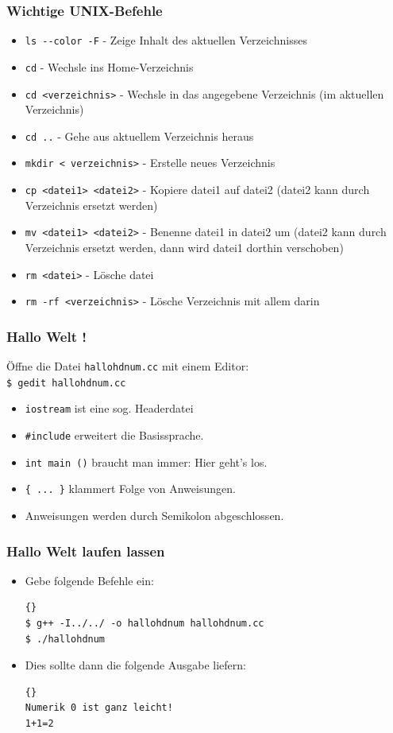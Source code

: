 \documentclass[ignorenonframetext,12pt]{beamer}
\theoremstyle{definition}
\theoremstyle{definition}
\begin{document}
\begin{frame}
\frametitle{Wichtige UNIX-Befehle}
\begin{itemize}
\item \lstinline{ls --color -F} - Zeige Inhalt des aktuellen Verzeichnisses
\item \lstinline{cd} - Wechsle ins Home-Verzeichnis
\item \lstinline{cd <verzeichnis>} - Wechsle in das angegebene
  Verzeichnis (im aktuellen Verzeichnis)
\item \lstinline{cd ..} - Gehe aus aktuellem Verzeichnis heraus
\item \lstinline{mkdir < verzeichnis>} - Erstelle neues Verzeichnis
\item \lstinline{cp <datei1> <datei2>} - Kopiere datei1 auf datei2
  (datei2 kann durch Verzeichnis ersetzt werden)
\item \lstinline{mv <datei1> <datei2>} - Benenne datei1 in datei2 um
  (datei2 kann durch Verzeichnis ersetzt werden, dann wird datei1
  dorthin verschoben)
\item \lstinline{rm <datei>} - Lösche datei
\item \lstinline{rm -rf <verzeichnis>} - Lösche Verzeichnis mit allem darin
\end{itemize}
\end{frame}

\begin{frame}[fragile]
\frametitle{Hallo Welt !}
Öffne die Datei \lstinline{hallohdnum.cc} mit einem Editor:
\\ \lstinline{$ gedit hallohdnum.cc} %

\begin{itemize}
\item \lstinline{iostream} ist eine sog. \glqq{}Headerdatei\grqq{}
\item \lstinline!#include! erweitert die \glqq{}Basissprache\grqq{}.
\item \lstinline!int main ()! braucht man immer: \glqq{}Hier geht's los\grqq{}.
\item \lstinline!{ ... }! klammert Folge von Anweisungen.
\item Anweisungen werden durch Semikolon abgeschlossen.
\end{itemize}
\end{frame}

\begin{frame}[fragile]
\frametitle{Hallo Welt laufen lassen}
\begin{itemize}
\item Gebe folgende Befehle ein:
{\small\begin{lstlisting}{}
$ g++ -I../../ -o hallohdnum hallohdnum.cc
$ ./hallohdnum
\end{lstlisting}}
\item Dies sollte dann die folgende Ausgabe liefern:
{\small\begin{lstlisting}{}
Numerik 0 ist ganz leicht!
1+1=2
\end{lstlisting}}
\end{itemize}
\end{frame}
\end{document}

